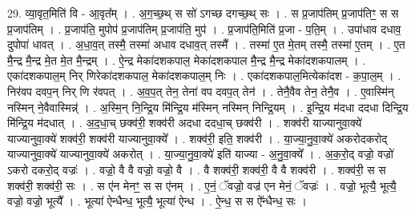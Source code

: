 \documentclass[17pt]{extarticle}
\begin{document}
29. व्या॒वृत॒मिति॑ वि - आ॒वृत᳚म् । . अ॒ग॒च्छ॒थ् स सो॑ ऽगच्छ दगच्छ॒थ् सः । . स प्र॒जाप॑तिम् प्र॒जाप॑तिꣳ॒॒ स स प्र॒जाप॑तिम् । . प्र॒जाप॑ति॒ मुपोप॑ प्र॒जाप॑तिम् प्र॒जाप॑ति॒ मुप॑ । . प्र॒जाप॑ति॒मिति॑ प्र॒जा - प॒ति॒म् । . उपा॑धाव दधाव॒ दुपोपा॑ धावत् । . अ॒धा॒व॒त् तस्मै॒ तस्मा॑ अधाव दधाव॒त् तस्मै᳚ । . तस्मा॑ ए॒त मे॒तम् तस्मै॒ तस्मा॑ ए॒तम् । . ए॒त मै॒न्द्र मै॒न्द्र मे॒त मे॒त मै॒न्द्रम् । . ऐ॒न्द्र मेका॑दशकपाल॒ मेका॑दशकपाल मै॒न्द्र मै॒न्द्र मेका॑दशकपालम् । . एका॑दशकपाल॒म् निर् णिरेका॑दशकपाल॒ मेका॑दशकपाल॒म् निः । . एका॑दशकपाल॒मित्येका॑दश - क॒पा॒ल॒म् । . निर॑वप दवप॒न् निर् णि र॑वपत् । . अ॒व॒प॒त् तेन॒ तेना॑ वप दवप॒त् तेन॑ । . तेनै॒वैव तेन॒ तेनै॒व । . ए॒वास्मि॑न् नस्मिन् ने॒वैवास्मिन्न्॑ । . अ॒स्मि॒न् नि॒न्द्रि॒य मि॑न्द्रि॒य म॑स्मिन् नस्मिन् निन्द्रि॒यम् । . इ॒न्द्रि॒य म॑दधा ददधा दिन्द्रि॒य मि॑न्द्रि॒य म॑दधात् । . अ॒द॒धा॒च् छक्व॑री॒ शक्व॑री अदधा ददधा॒च् छक्व॑री । . शक्व॑री याज्यानुवा॒क्ये॑ याज्यानुवा॒क्ये॑ शक्व॑री॒ शक्व॑री याज्यानुवा॒क्ये᳚ । . शक्व॑री॒ इति॒ शक्व॑री । . या॒ज्या॒नु॒वा॒क्ये॑ अकरोदकरोद् याज्यानुवा॒क्ये॑ याज्यानुवा॒क्ये॑ अकरोत् । . या॒ज्या॒नु॒वा॒क्ये॑ इति॑ याज्या - अ॒नु॒वा॒क्ये᳚ । . अ॒क॒रो॒द् वज्रो॒ वज्रो॑ ऽकरो दकरो॒द् वज्रः॑ । . वज्रो॒ वै वै वज्रो॒ वज्रो॒ वै । . वै शक्व॑री॒ शक्व॑री॒ वै वै शक्व॑री । . शक्व॑री॒ स स शक्व॑री॒ शक्व॑री॒ सः । . स ए॑न मेनꣳ॒॒ स स ए॑नम् । . ए॒नं॒ ॅवज्रो॒ वज्र॑ एन मेनं॒ ॅवज्रः॑ । . वज्रो॒ भूत्यै॒ भूत्यै॒ वज्रो॒ वज्रो॒ भूत्यै᳚ । . भूत्या॑ ऐन्धैन्ध॒ भूत्यै॒ भूत्या॑ ऐन्ध । . ऐ॒न्ध॒ स स ऐ᳚न्धैन्ध॒ सः । \newline
\end{document}
